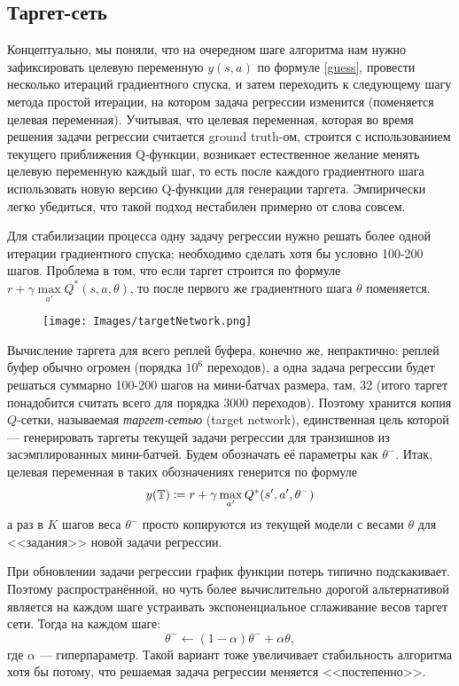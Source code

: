 \subsection{Таргет-сеть}

Концептуально, мы поняли, что на очередном шаге алгоритма нам нужно зафиксировать целевую переменную $y(s, a)$ по формуле \eqref{guess}, провести несколько итераций градиентного спуска, и затем переходить к следующему шагу метода простой итерации, на котором задача регрессии изменится (поменяется целевая переменная). Учитывая, что целевая переменная, которая во время решения задачи регрессии считается ground truth-ом, строится с использованием текущего приближения Q-функции, возникает естественное желание менять целевую переменную каждый шаг, то есть после каждого градиентного шага использовать новую версию Q-функции для генерации таргета. Эмпирически легко убедиться, что такой подход нестабилен примерно от слова совсем. 

Для стабилизации процесса одну задачу регрессии нужно решать более одной итерации градиентного спуска; необходимо сделать хотя бы условно 100-200 шагов. Проблема в том, что если таргет строится по формуле $r + \gamma \max\limits_{a'} Q^*(s, a, \theta)$, то после первого же градиентного шага $\theta$ поменяется.

\begin{wrapfigure}{r}{0.4\textwidth}
\vspace{-0.3cm}
\centering
\texttt{[image: Images/targetNetwork.png]}
\vspace{-1.5cm}
\end{wrapfigure}

Вычисление таргета для всего реплей буфера, конечно же, непрактично: реплей буфер обычно огромен (порядка $10^6$ переходов), а одна задача регрессии будет решаться суммарно 100-200 шагов на мини-батчах размера, там, 32 (итого таргет понадобится считать всего для порядка 3000 переходов). Поэтому хранится копия $Q$-сетки, называемая \emph{таргет-сетью} (target network), единственная цель которой --- генерировать таргеты текущей задачи регрессии для транзишнов из засэмплированных мини-батчей. Будем обозначать её параметры как $\theta^{-}$. Итак, целевая переменная в таких обозначениях генерится по формуле
$$y( \mathbb{T} ) \coloneqq r + \gamma \max\limits_{a'} Q^*(s', a', \theta^{-})$$
а раз в $K$ шагов веса $\theta^{-}$ просто копируются из текущей модели с весами $\theta$ для <<задания>> новой задачи регрессии.

\begin{remark}
При обновлении задачи регрессии график функции потерь типично подскакивает. Поэтому распространённой, но чуть более вычислительно дорогой альтернативой является на каждом шаге устраивать экспоненциальное сглаживание весов таргет сети. Тогда на каждом шаге:
$$\theta^{-} \leftarrow (1 - \alpha) \theta^{-} + \alpha \theta,$$
где $\alpha$ --- гиперпараметр. Такой вариант тоже увеличивает стабильность алгоритма хотя бы потому, что решаемая задача регрессии меняется <<постепенно>>.
\end{remark}

